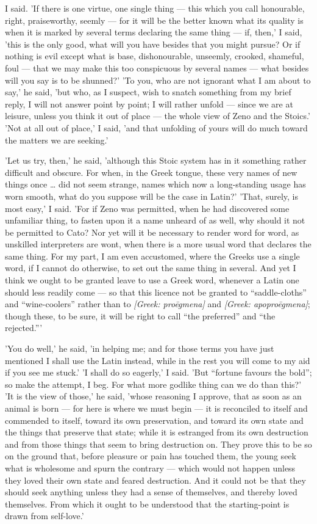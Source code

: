  I said. 'If there is one virtue, one single thing — this which you call honourable, right, praiseworthy, seemly — for it will be the better known what its quality is when it is marked by several terms declaring the same thing — if, then,' I said, 'this is the only good, what will you have besides that you might pursue? Or if nothing is evil except what is base, dishonourable, unseemly, crooked, shameful, foul — that we may make this too conspicuous by several names — what besides will you say is to be shunned?' 'To you, who are not ignorant what I am about to say,' he said, 'but who, as I suspect, wish to snatch something from my brief reply, I will not answer point by point; I will rather unfold — since we are at leisure, unless you think it out of place — the whole view of Zeno and the Stoics.' 'Not at all out of place,' I said, 'and that unfolding of yours will do much toward the matters we are seeking.'

 'Let us try, then,' he said, 'although this Stoic system has in it something rather difficult and obscure. For when, in the Greek tongue, these very names of new things once … did not seem strange, names which now a long-standing usage has worn smooth, what do you suppose will be the case in Latin?' 'That, surely, is most easy,' I said. 'For if Zeno was permitted, when he had discovered some unfamiliar thing, to fasten upon it a name unheard of as well, why should it not be permitted to Cato? Nor yet will it be necessary to render word for word, as unskilled interpreters are wont, when there is a more usual word that declares the same thing. For my part, I am even accustomed, where the Greeks use a single word, if I cannot do otherwise, to set out the same thing in several. And yet I think we ought to be granted leave to use a Greek word, whenever a Latin one should less readily come — so that this licence not be granted to ``saddle-cloths'' and ``wine-coolers'' rather than to \textit{[Greek: proēgmena]} and \textit{[Greek: apoproēgmena]}; though these, to be sure, it will be right to call ``the preferred'' and ``the rejected.'''

 'You do well,' he said, 'in helping me; and for those terms you have just mentioned I shall use the Latin instead, while in the rest you will come to my aid if you see me stuck.' 'I shall do so eagerly,' I said. 'But ``fortune favours the bold''; so make the attempt, I beg. For what more godlike thing can we do than this?' 'It is the view of those,' he said, 'whose reasoning I approve, that as soon as an animal is born — for here is where we must begin — it is reconciled to itself and commended to itself, toward its own preservation, and toward its own state and the things that preserve that state; while it is estranged from its own destruction and from those things that seem to bring destruction on. They prove this to be so on the ground that, before pleasure or pain has touched them, the young seek what is wholesome and spurn the contrary — which would not happen unless they loved their own state and feared destruction. And it could not be that they should seek anything unless they had a sense of themselves, and thereby loved themselves. From which it ought to be understood that the starting-point is drawn from self-love.'

